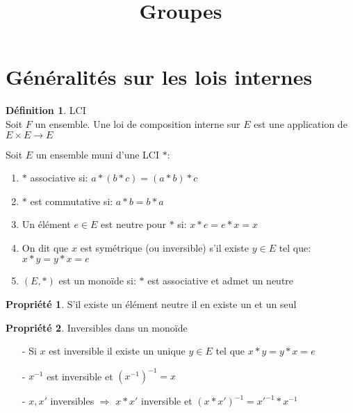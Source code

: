 \documentclass[fleqn]{article}
\title{Groupes}
\date{}
\theoremstyle{definition} \newtheorem*{defi}{D\'efinition}
\theoremstyle{definition} \newtheorem*{theo}{Th\'eor\`eme}
\theoremstyle{definition} \newtheorem*{coro}{Corollaire}
\theoremstyle{remark} \newtheorem*{rqs}{Remarques}
\theoremstyle{definition} \newtheorem*{prop}{Propri\'et\'e}
\begin{document}
\maketitle

\section{G\'en\'eralit\'es sur les lois internes}
\begin{defi} LCI \\
Soit $F$ un ensemble. Une loi de composition interne sur $E$ est une application de $E\times E \rightarrow E$
\end{defi}

Soit $E$ un ensemble muni d'une LCI $*$:
\begin{enumerate}
	\item $*$ associative si: $a*(b*c) = (a*b)*c$
	\item $*$ est commutative si: $a*b = b*a$
	\item Un \'el\'ement $e \in E$ est neutre pour $*$ si: $x*e = e*x = x$
	\item On dit que $x$ est sym\'etrique (ou inversible) s'il existe $y \in E$ tel que: $x*y = y*x = e$
	\item $(E,*)$ est un mono\"ide si: $*$ est associative et admet un neutre
\end{enumerate}

\begin{prop}
	S'il existe un \'el\'ement neutre il en existe un et un seul
\end{prop}

\begin{prop} Inversibles dans un mono\"ide
	\begin{itemize}
		\item [-] Si $x$ est inversible il existe un unique $y \in E$ tel que $x*y = y*x = e$
		\item [-] $x^{-1}$ est inversible et $(x^{-1})^{-1} = x$
		\item [-] $x, x'$ inversibles $\Rightarrow$ $x*x'$ inversible et $(x*x')^{-1} = x'^{-1}*x^{-1}$
	\end{itemize}
\end{prop}
\end{document}
